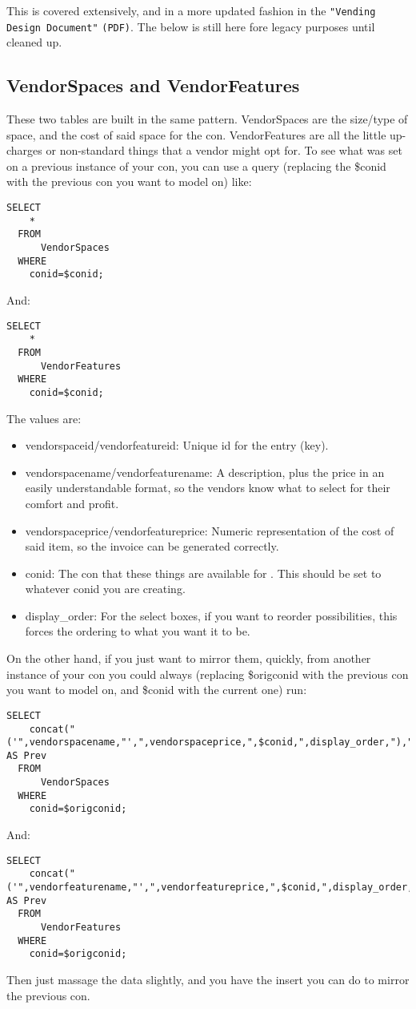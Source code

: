 \documentclass[captions=tablesignature]{scrartcl}
\begin{document}
This is covered extensively, and in a more updated fashion in the
\texttt{"Vending Design Document"} \texttt{(PDF)}.  The below is still here fore
legacy purposes until cleaned up.
\subsection{VendorSpaces and VendorFeatures}
\label{sec-14-1}
These two tables are built in the same pattern. VendorSpaces are
the size/type of space, and the cost of said space for the con.
VendorFeatures are all the little up-charges or non-standard things
that a vendor might opt for.  To see what was set on a previous
instance of your con, you can use a query (replacing the \$conid
with the previous con you want to model on) like:
\begin{verbatim}
SELECT
    *
  FROM
      VendorSpaces
  WHERE
    conid=$conid;
\end{verbatim}
And:
\begin{verbatim}
SELECT
    *
  FROM
      VendorFeatures
  WHERE
    conid=$conid;
\end{verbatim}
The values are:
\begin{itemize}
\item vendorspaceid/vendorfeatureid: Unique id for the entry (key).
\item vendorspacename/vendorfeaturename: A description, plus the price
in an easily understandable format, so the vendors know what to
select for their comfort and profit.
\item vendorspaceprice/vendorfeatureprice: Numeric representation of
the cost of said item, so the invoice can be generated
correctly.
\item conid: The con that these things are available for .  This should
be set to whatever conid you are creating.
\item display\_order: For the select boxes, if you want to reorder
possibilities, this forces the ordering to what you want it to
be.
\end{itemize}

On the other hand, if you just want to mirror them, quickly, from
another instance of your con you could always (replacing \$origconid
with the previous con you want to model on, and \$conid with the
current one) run:
\begin{verbatim}
SELECT
    concat("('",vendorspacename,"',",vendorspaceprice,",$conid,",display_order,"),") AS Prev
  FROM
      VendorSpaces
  WHERE
    conid=$origconid;
\end{verbatim}
And:
\begin{verbatim}
SELECT
    concat("('",vendorfeaturename,"',",vendorfeatureprice,",$conid,",display_order,"),") AS Prev
  FROM
      VendorFeatures
  WHERE
    conid=$origconid;
\end{verbatim}
Then just massage the data slightly, and you have the insert you
can do to mirror the previous con.
\end{document}
